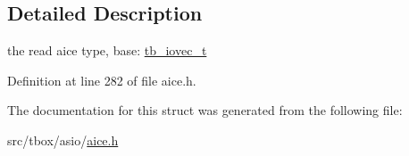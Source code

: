 \subsection{Detailed Description}
the read aice type, base\-: \hyperlink{structtb__iovec__t}{tb\-\_\-iovec\-\_\-t} 

Definition at line 282 of file aice.\-h.



The documentation for this struct was generated from the following file\-:\begin{DoxyCompactItemize}
\item 
src/tbox/asio/\hyperlink{aice_8h}{aice.\-h}\end{DoxyCompactItemize}
